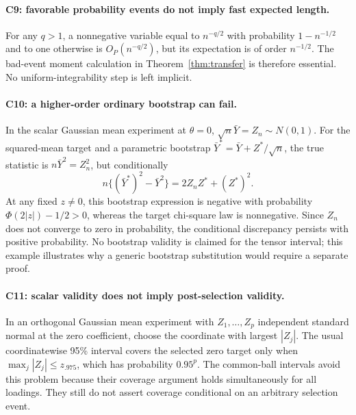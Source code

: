 \paragraph{C9: favorable probability events do not imply fast expected length.}
For any $q>1$, a nonnegative variable equal to $n^{-q/2}$ with probability $1-n^{-1/2}$ and to one otherwise is $O_P(n^{-q/2})$, but its expectation is of order $n^{-1/2}$. The bad-event moment calculation in Theorem~\ref{thm:transfer} is therefore essential. No uniform-integrability step is left implicit.

\paragraph{C10: a higher-order ordinary bootstrap can fail.}
In the scalar Gaussian mean experiment at $\theta=0$, $\sqrt n\bar Y=Z_n\sim N(0,1)$. For the squared-mean target and a parametric bootstrap $\bar Y^*=\bar Y+Z^*/\sqrt n$, the true statistic is $n\bar Y^2=Z_n^2$, but conditionally
\[
 n\{(\bar Y^*)^2-\bar Y^2\}=2Z_nZ^*+(Z^*)^2.
\]
At any fixed $z\ne0$, this bootstrap expression is negative with probability $\Phi(2|z|)-1/2>0$, whereas the target chi-square law is nonnegative. Since $Z_n$ does not converge to zero in probability, the conditional discrepancy persists with positive probability. No bootstrap validity is claimed for the tensor interval; this example illustrates why a generic bootstrap substitution would require a separate proof.

\paragraph{C11: scalar validity does not imply post-selection validity.}
In an orthogonal Gaussian mean experiment with $Z_1,\ldots,Z_p$ independent standard normal at the zero coefficient, choose the coordinate with largest $|Z_j|$. The usual coordinatewise 95\% interval covers the selected zero target only when $\max_j|Z_j|\le z_{.975}$, which has probability $0.95^p$. The common-ball intervals avoid this problem because their coverage argument holds simultaneously for all loadings. They still do not assert coverage conditional on an arbitrary selection event.

